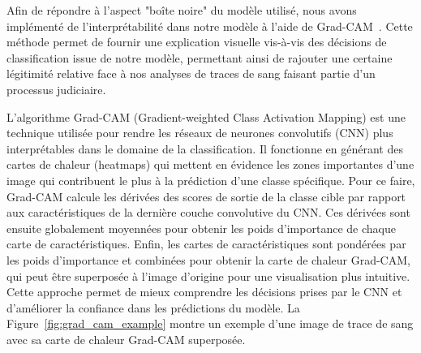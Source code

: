 Afin de répondre à l'aspect "boîte noire" du modèle utilisé, nous avons implémenté de l'interprétabilité dans notre modèle à l'aide de Grad-CAM~\cite{GRADCAM}. Cette méthode permet de fournir une explication visuelle vis-à-vis des décisions de classification issue de notre modèle, permettant ainsi de rajouter une certaine légitimité relative face à nos analyses de traces de sang faisant partie d'un processus judiciaire. 

L'algorithme Grad-CAM (Gradient-weighted Class Activation Mapping) est une technique utilisée pour rendre les réseaux de neurones convolutifs (CNN) plus interprétables dans le domaine de la classification.
Il fonctionne en générant des cartes de chaleur (heatmaps) qui mettent en évidence les zones importantes d'une image qui contribuent le plus à la prédiction d'une classe spécifique.
Pour ce faire, Grad-CAM calcule les dérivées des scores de sortie de la classe cible par rapport aux caractéristiques de la dernière couche convolutive du CNN.
Ces dérivées sont ensuite globalement moyennées pour obtenir les poids d'importance de chaque carte de caractéristiques.
Enfin, les cartes de caractéristiques sont pondérées par les poids d'importance et combinées pour obtenir la carte de chaleur Grad-CAM, qui peut être superposée à l'image d'origine pour une visualisation plus intuitive.
Cette approche permet de mieux comprendre les décisions prises par le CNN et d'améliorer la confiance dans les prédictions du modèle.
La Figure~\ref{fig:grad_cam_example} montre un exemple d'une image de trace de sang avec sa carte de chaleur Grad-CAM superposée.

